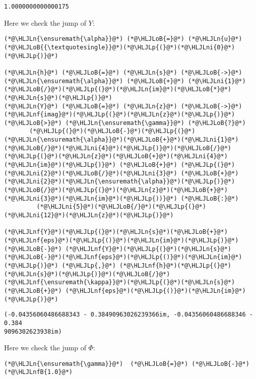 \documentclass[12pt,landscape]{article}
\newcommand{\HLJLn}[1]{#1}
\newcommand{\HLJLnf}[1]{\textcolor[RGB]{66,102,213}{#1}}
\newcommand{\HLJLnfB}[1]{\textcolor[RGB]{59,151,46}{#1}}
\newcommand{\HLJLni}[1]{\textcolor[RGB]{59,151,46}{#1}}
\newcommand{\HLJLoB}[1]{\textcolor[RGB]{102,102,102}{\textbf{#1}}}
\newcommand{\HLJLp}[1]{#1}
\begin{document}
{\begin{lstlisting}
1.0000000000000175
\end{lstlisting}


Here we check the jump of $Y$:


\begin{lstlisting}
(*@\HLJLn{\ensuremath{\alpha}}@*) (*@\HLJLoB{=}@*) (*@\HLJLn{u}@*)(*@\HLJLoB{{\textquotesingle}}@*)(*@\HLJLp{(}@*)(*@\HLJLni{0}@*)(*@\HLJLp{)}@*)

(*@\HLJLn{h}@*) (*@\HLJLoB{=}@*) (*@\HLJLn{s}@*) (*@\HLJLoB{->}@*) (*@\HLJLn{\ensuremath{\alpha}}@*) (*@\HLJLoB{+}@*) (*@\HLJLni{1}@*)(*@\HLJLoB{/}@*)(*@\HLJLp{(}@*)(*@\HLJLn{im}@*)(*@\HLJLoB{*}@*)(*@\HLJLn{s}@*)(*@\HLJLp{)}@*)
(*@\HLJLn{Y}@*) (*@\HLJLoB{=}@*) (*@\HLJLn{z}@*) (*@\HLJLoB{->}@*) (*@\HLJLnf{imag}@*)(*@\HLJLp{(}@*)(*@\HLJLn{z}@*)(*@\HLJLp{)}@*) (*@\HLJLoB{>}@*) (*@\HLJLn{\ensuremath{\gamma}}@*) (*@\HLJLoB{?}@*)
       (*@\HLJLp{(}@*)(*@\HLJLoB{-}@*)(*@\HLJLp{(}@*)(*@\HLJLn{\ensuremath{\alpha}}@*)(*@\HLJLoB{+}@*)(*@\HLJLni{1}@*)(*@\HLJLoB{/}@*)(*@\HLJLni{4}@*)(*@\HLJLp{)}@*)(*@\HLJLoB{/}@*)(*@\HLJLp{(}@*)(*@\HLJLn{z}@*)(*@\HLJLoB{+}@*)(*@\HLJLni{4}@*)(*@\HLJLn{im}@*)(*@\HLJLp{)}@*) (*@\HLJLoB{+}@*) (*@\HLJLp{(}@*)(*@\HLJLni{2}@*)(*@\HLJLoB{/}@*)(*@\HLJLni{3}@*) (*@\HLJLoB{+}@*) (*@\HLJLni{2}@*)(*@\HLJLn{\ensuremath{\alpha}}@*)(*@\HLJLp{)}@*)(*@\HLJLoB{/}@*)(*@\HLJLp{(}@*)(*@\HLJLn{z}@*)(*@\HLJLoB{+}@*)(*@\HLJLni{3}@*)(*@\HLJLn{im}@*)(*@\HLJLp{))}@*) (*@\HLJLoB{:}@*)
         (*@\HLJLni{5}@*)(*@\HLJLoB{/}@*)(*@\HLJLp{(}@*)(*@\HLJLni{12}@*)(*@\HLJLn{z}@*)(*@\HLJLp{)}@*)

(*@\HLJLnf{Y}@*)(*@\HLJLp{(}@*)(*@\HLJLn{s}@*)(*@\HLJLoB{+}@*)(*@\HLJLnf{eps}@*)(*@\HLJLp{()}@*)(*@\HLJLn{im}@*)(*@\HLJLp{)}@*) (*@\HLJLoB{-}@*) (*@\HLJLnf{Y}@*)(*@\HLJLp{(}@*)(*@\HLJLn{s}@*)(*@\HLJLoB{-}@*)(*@\HLJLnf{eps}@*)(*@\HLJLp{()}@*)(*@\HLJLn{im}@*)(*@\HLJLp{)}@*) (*@\HLJLp{,}@*) (*@\HLJLnf{h}@*)(*@\HLJLp{(}@*)(*@\HLJLn{s}@*)(*@\HLJLp{)}@*)(*@\HLJLoB{/}@*)(*@\HLJLnf{\ensuremath{\kappa}}@*)(*@\HLJLp{(}@*)(*@\HLJLn{s}@*) (*@\HLJLoB{+}@*) (*@\HLJLnf{eps}@*)(*@\HLJLp{()}@*)(*@\HLJLn{im}@*)(*@\HLJLp{)}@*)
\end{lstlisting}

\begin{lstlisting}
(-0.04356060486688343 - 0.38490963026239366im, -0.04356060486688346 - 0.384
9096302623938im)
\end{lstlisting}


Here we check the jump of $\Phi$:


\begin{lstlisting}
(*@\HLJLn{\ensuremath{\gamma}}@*)  (*@\HLJLoB{=}@*) (*@\HLJLoB{-}@*)(*@\HLJLnfB{1.0}@*)


\end{lstlisting}}
\end{document}
